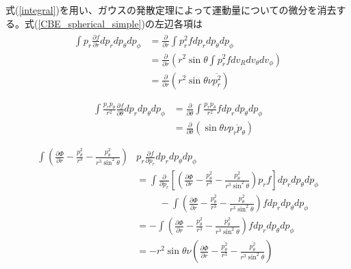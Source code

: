 式(\ref{integral})を用い、ガウスの発散定理によって運動量についての微分を消去する。式(\ref{CBE_spherical_simple})の左辺各項は
\begin{align}
\begin{aligned}
	\int p_r\frac{\partial f}{\partial r}dp_r dp_{\theta} dp_{\phi} &= \frac{\partial}{\partial r} \int p_r^2 f dp_r dp_{\theta} dp_{\phi} \\
	&= \frac{\partial}{\partial r} \left(r^2\sin\theta \int p_r^2f dv_R dv_{\theta} dv_{\phi} \right) \\
	&= \frac{\partial}{\partial r} \left(r^2\sin\theta \nu \overline{p_r^2} \right) \\
\end{aligned}
\end{align}
\begin{align}
\begin{aligned}
	\int \frac{p_r p_{\theta}}{r^2} \frac{\partial f}{\partial \theta} dp_r dp_{\theta} dp_{\phi} &= \frac{\partial}{\partial \theta} \int \frac{p_r p_{\theta}}{r^2} f dp_r dp_{\theta} dp_{\phi} \\
	&= \frac{\partial}{\partial \theta}(\sin\theta \nu \overline{p_r p_{\theta}}) \\
\end{aligned}
\end{align}
\begin{align}
\begin{aligned}
	\int \left(\frac{\partial \Phi}{\partial r} - \frac{p_{\theta}^2}{r^3} - \frac{p_{\theta}^2}{r^3 \sin^2\theta} \right) & p_r \frac{\partial f}{\partial p_r}dp_r dp_{\theta} dp_{\phi} \\
	&= \int \frac{\partial}{\partial p_r} \left[ \left(\frac{\partial \Phi}{\partial r} - \frac{p_{\theta}^2}{r^3} - \frac{p_{\theta}^2}{r^3 \sin^2\theta} \right) p_r f\right] dp_r dp_{\theta} dp_{\phi} \\
	& \hspace{1cm }- \int \left(\frac{\partial \Phi}{\partial r} - \frac{p_{\theta}^2}{r^3} - \frac{p_{\theta}^2}{r^3 \sin^2\theta} \right) f dp_r dp_{\theta} dp_{\phi} \\
	&= - \int \left(\frac{\partial \Phi}{\partial r} - \frac{p_{\theta}^2}{r^3} - \frac{p_{\theta}^2}{r^3 \sin^2\theta} \right) f dp_r dp_{\theta} dp_{\phi} \\
	&= - r^2\sin\theta \nu \left(\frac{\partial \Phi}{\partial r} - \frac{\overline{p_{\theta}^2}}{r^3} - \frac{\overline{p_{\theta}^2}}{r^3 \sin^2\theta} \right) \\
\end{aligned}
\end{align}
